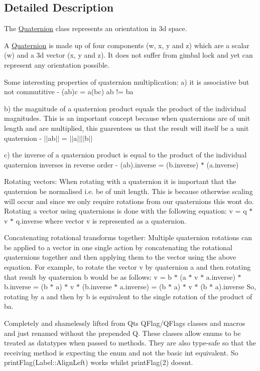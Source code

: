 \subsection{Detailed Description}
The \hyperlink{classprism_1_1_quaternion}{Quaternion} class represents an orientation in 3d space. 

A \hyperlink{classprism_1_1_quaternion}{Quaternion} is made up of four components (w, x, y and z) which are a scalar (w) and a 3d vector (x, y and z). It does not suffer from gimbal lock and yet can represent any orientation possible.

Some interesting properties of quaternion multiplication\+: a) it is associative but not commutitive -\/ (ab)c = a(bc) ab != ba

b) the magnitude of a quaternion product equals the product of the individual magnitudes. This is an important concept because when quaternions are of unit length and are multiplied, this guarentees us that the result will itself be a unit quaternion -\/ $\vert$$\vert$ab$\vert$$\vert$ = $\vert$$\vert$a$\vert$$\vert$$\vert$$\vert$b$\vert$$\vert$

c) the inverse of a quaternion product is equal to the product of the individual quaternion inverses in reverse order -\/ (ab).inverse = (b.\+inverse) $\ast$ (a.\+inverse)

Rotating vectors\+: When rotating with a quaternion it is important that the quaternion be normalised i.\+e. be of unit length. This is because otherwise scaling will occur and since we only require rotations from our quaternions this won\textquotesingle{}t do. Rotating a vector using quaternions is done with the following equation\+: v\textquotesingle{} = q $\ast$ v $\ast$ q.\+inverse where vector v is represented as a quaternion.

Concatenating rotational transforms together\+: Multiple quaternion rotations can be applied to a vector in one single action by concatenating the rotational quaternions together and then applying them to the vector using the above equation. For example, to rotate the vector v by quaternion a and then rotating that result by quaternion b would be as follows\+: v\textquotesingle{} = b $\ast$ (a $\ast$ v $\ast$ a.\+inverse) $\ast$ b.\+inverse = (b $\ast$ a) $\ast$ v $\ast$ (b.\+inverse $\ast$ a.\+inverse) = (b $\ast$ a) $\ast$ v $\ast$ (b $\ast$ a).inverse So, rotating by a and then by b is equivalent to the single rotation of the product of ba.

Completely and shamelessly lifted from Qt\textquotesingle{}s Q\+Flag/\+Q\+Flags classes and macros and just renamed without the prepended \textquotesingle{}Q\textquotesingle{}. These classes allow enums to be treated as datatypes when passed to methods. They are also type-\/safe so that the receiving method is expecting the enum and not the basic int equivalent. So print\+Flag(\+Label\+::\+Align\+Left) works whilst print\+Flag(2) doesn\textquotesingle{}t.

